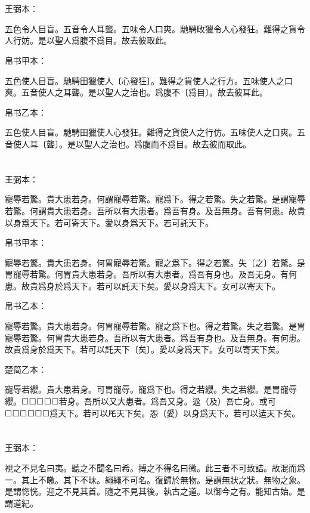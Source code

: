 \documentclass[a5paper]{ctexbook}
\begin{document}
    \chapter{}
    王弼本：

    五色令人目盲。五音令人耳聾。五味令人口爽。馳騁畋獵令人心發狂。難得之貨令人行妨。是以聖人爲腹不爲目。故去彼取此。

    
    帛书甲本：

    五色使人目盲。馳騁田獵使人〔心發狂〕。難得之貨使人之行方。五味使人之口爽。五音使人之耳聾。是以聖人之治也。爲腹不〔爲目〕。故去彼耳此。

    帛书乙本：

    五色使人目盲。馳騁田獵使人心發狂。難得之貨使人之行仿。五味使人之口爽。五音使人耳〔聾〕。是以聖人之治也。爲腹而不爲目。故去彼而取此。

    \chapter{}
    王弼本：

    寵辱若驚。貴大患若身。何謂寵辱若驚。寵爲下。得之若驚。失之若驚。是謂寵辱若驚。何謂貴大患若身。吾所以有大患者。爲吾有身。及吾無身。吾有何患。故貴以身爲天下。若可寄天下。愛以身爲天下。若可託天下。

    
    帛书甲本：

    寵辱若驚。貴大患若身。何胃寵辱若驚。寵之爲下。得之若驚。失〔之〕若驚。是胃寵辱若驚。何胃貴大患若身。吾所以有大患者。爲吾有身也。及吾无身。有何患。故貴爲身於爲天下。若可以託天下矣。愛以身爲天下。女可以寄天下。

    帛书乙本：

    寵辱若驚。貴大患若身。何胃寵辱若驚。寵之爲下也。得之若驚。失之若驚。是胃寵辱若驚。何胃貴大患若身。吾所以有大患者。爲吾有身也。及吾無身。有何患。故貴爲身於爲天下。若可以託天下〔矣〕。愛以身爲天下。女可以寄天下矣。

    楚简乙本：

    寵辱若纓。貴大患若身。可胃寵辱。寵爲下也。得之若纓。失之若纓。是胃寵辱纓。☐☐☐☐☐若身。吾所以又大患者。爲吾又身。﨤（及）吾亡身。或可☐☐☐☐☐☐爲天下。若可以厇天下矣。㤅（愛）以身爲天下。若可以迲天下矣。

    \chapter{}
    王弼本：

    視之不見名曰夷。聽之不聞名曰希。搏之不得名曰微。此三者不可致詰。故混而爲一。其上不皦。其下不昧。繩繩不可名。復歸於無物。是謂無狀之狀。無物之象。是謂惚恍。迎之不見其首。隨之不見其後。執古之道。以御今之有。能知古始。是謂道紀。
\end{document}
